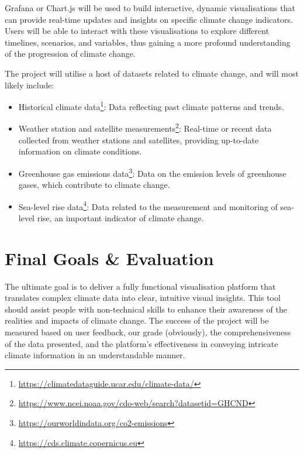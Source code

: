 \documentclass{article} %
\begin{document}
Grafana or Chart.js will be used to build interactive, dynamic visualisations that can provide real-time updates and insights on specific climate change indicators. Users will be able to interact with these visualisations to explore different timelines, scenarios, and variables, thus gaining a more profound understanding of the progression of climate change.

The project will utilise a host of datasets related to climate change, and will most likely include:
\begin{itemize}
    \item Historical climate data\footnote{\url{https://climatedataguide.ucar.edu/climate-data/}}: Data reflecting past climate patterns and trends.
    \item Weather station and satellite measurements\footnote{\url{https://www.ncei.noaa.gov/cdo-web/search?datasetid=GHCND}}: Real-time or recent data collected from weather stations and satellites, providing up-to-date information on climate conditions.
    \item Greenhouse gas emissions data\footnote{\url{https://ourworldindata.org/co2-emissions}}: Data on the emission levels of greenhouse gases, which contribute to climate change.
    \item Sea-level rise data\footnote{\url{https://cds.climate.copernicus.eu}}: Data related to the measurement and monitoring of sea-level rise, an important indicator of climate change.
\end{itemize}

\section{Final Goals \& Evaluation}
The ultimate goal is to deliver a fully functional visualisation platform that translates complex climate data into clear, intuitive visual insights. This tool should assist people with non-technical skills to enhance their awareness of the realities and impacts of climate change. The success of the project will be measured based on user feedback, our grade (obviously), the comprehensiveness of the data presented, and the platform's effectiveness in conveying intricate climate information in an understandable manner.





\end{document}
